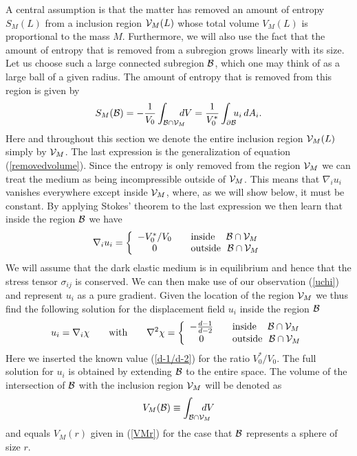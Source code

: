 \documentclass[a4paper,12pt]{article}
\newcommand{\be}{\begin{equation}}
\newcommand{\ee}{\end{equation}}
\begin{document}
A central assumption is that the matter has removed an amount of entropy $S_M(L)$ from a 
inclusion region ${\cal V}_M(L)$ whose total volume $V_M(L)$ is proportional to the mass $M$.  Furthermore, 
we will also use the fact that the amount of entropy that is removed from a subregion grows linearly with its size.  Let us choose such a large connected subregion $\cal B$, which one may think of as a large ball of a given radius.  The amount of entropy that is removed from this region is given by
\be
\label{SM2}
S_M({\cal B}) = -{1\over V_0} 
\int_{{\cal B}\cap {\cal V}_M} \!\!\! \!\!  {dV} 
={1\over V^*_0} \int_{\partial {\cal B}}  \!\!\!u_i \, {dA_i} .
\ee
Here and throughout this section we denote  the entire inclusion region ${\cal V}_M (L)$ simply by ${\cal V}_M$.
The last expression is the generalization of equation (\ref{removedvolume}).
Since the entropy is only removed from the region ${\cal V}_M$ we can treat the medium as being incompressible outside of ${\cal V}_M$. This means that $\nabla_iu_i$ vanishes everywhere except inside  ${\cal V}_M$, where, as we will show below, it must be constant. 
    By applying Stokes' theorem to the last expression we then learn that inside the region $\cal B$ we have
\be
\label{ansatz1}
\nabla_iu_i =\left\lbrace\begin{array}{cl} {-V_0^*/V_0}\quad & \mbox{inside $\  \ \,  {\cal B} \cap {\cal V }_M$}\\ 0\quad & \mbox{outside $\ {\cal B} \cap {\cal V }_M$} \end{array}\right.
\ee
We will assume that the dark elastic medium is in equilibrium and hence that the stress tensor $\sigma_{ij}$ is conserved. We can then make use of our observation (\ref{uchi})  and represent $u_i$ as a pure gradient. 
 Given the location of the region ${\cal V}_M$  we thus find the following solution for the displacement field $u_i$ inside the region $\cal B$ 
  \be
\label{ansatz2}
u_{i} %
= \nabla_i\chi %
\quad\quad\mbox{with}\quad\quad
\nabla^2 \chi =\left\lbrace\begin{array}{cl} %
-{d-1\over d-2} 
 \quad & \mbox{inside $\  \ \,  {\cal B} \cap {\cal V }_M $}\\ 0\quad & \mbox{outside $\    {\cal B} \cap {\cal V }_M $} \end{array}\right.
\ee
Here we inserted the known value (\ref{d-1/d-2}) for the ratio $V^*_0/V_0$.  The full solution for $u_i$ is obtained by extending $\cal B$ to the entire space. The volume of the intersection of $\cal B$ with the inclusion region ${\cal V}_M$ will be denoted as
\begin{equation}
\label{VMB}
V_M({\cal B})  \equiv \int_{{\cal B}\cap {\cal V}_M} \!\!\!\!\!\!\! dV 
\end{equation}
and equals $V_M(r)$ given in (\ref{VMr}) for the case   that $\cal B$ represents a sphere of size $r$. 
\end{document}
